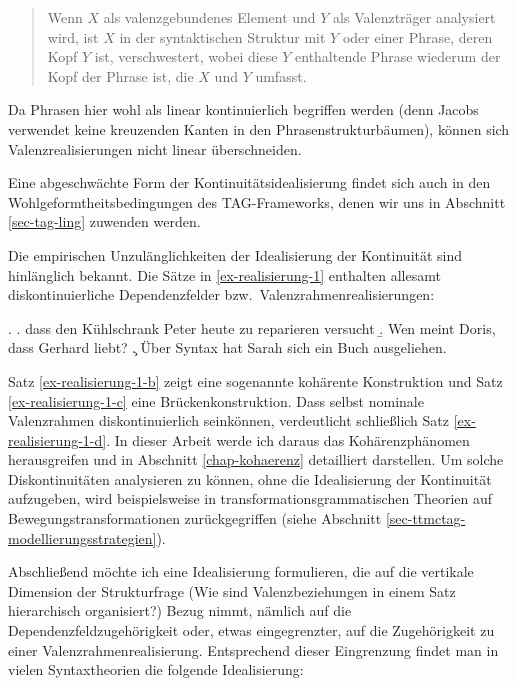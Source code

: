 \begin{quote}
Wenn $X$ als valenzgebundenes Element und $Y$ als Valenzträger analysiert wird, ist $X$ in der syntaktischen Struktur mit $Y$ oder einer Phrase, deren Kopf $Y$ ist, verschwestert, wobei diese $Y$ enthaltende Phrase wiederum der Kopf der Phrase ist, die $X$ und $Y$ umfasst. \citep[497]{Jacobs:09}
\end{quote}
Da Phrasen hier wohl als linear kontinuierlich begriffen werden (denn Jacobs verwendet keine kreuzenden Kanten in den Phrasenstrukturbäumen), können sich Valenzrealisierungen nicht linear überschneiden.  

Eine abgeschwächte Form der Kontinuitätsidealisierung findet sich auch in den Wohlgeformtheitsbedingungen des TAG-Frameworks, denen wir uns in Abschnitt \ref{sec-tag-ling} zuwenden werden. %

Die empirischen Unzulänglichkeiten der Idealisierung der Kontinuität sind hinlänglich bekannt. Die Sätze in \ref{ex-realisierung-1} enthalten allesamt diskontinuierliche Dependenzfelder bzw.\ Valenzrahmenrealisierungen:

\ex. \label{ex-realisierung-1}
\a. \label{ex-realisierung-1-b} dass den Kühlschrank Peter heute zu reparieren versucht
\b. \label{ex-realisierung-1-c} Wen meint Doris, dass Gerhard liebt? \hfill \citep[(2c)]{Featherston:05}
\c. \label{ex-realisierung-1-d} Über Syntax hat Sarah sich ein Buch ausgeliehen. \\ \citep[(1)]{DeKuthy:02}  

Satz \ref{ex-realisierung-1-b} zeigt eine sogenannte kohärente Konstruktion und Satz \ref{ex-realisierung-1-c} eine Brückenkonstruktion. Dass selbst nominale Valenzrahmen diskontinuierlich sein\linebreak können, verdeutlicht schließlich Satz \ref{ex-realisierung-1-d}. In dieser Arbeit werde ich daraus das Kohärenzphänomen herausgreifen und in Abschnitt \ref{chap-kohaerenz} detailliert darstellen. Um solche Diskontinuitäten analysieren zu können, ohne die Idealisierung der Kontinuität aufzugeben, wird beispielsweise in transformationsgrammatischen Theorien auf Bewegungstransformationen zurückgegriffen (siehe Abschnitt \ref{sec-ttmctag-modellierungsstrategien}). %


Abschlie\ss end möchte ich eine Idealisierung formulieren, die auf die vertikale Dimension der Strukturfrage (Wie sind Valenzbeziehungen in einem Satz hierarchisch organisiert?) Bezug nimmt, nämlich auf die Dependenzfeldzugehörigkeit oder, etwas eingegrenzter, auf die Zugehörigkeit zu einer Valenzrahmenrealisierung. Entsprechend dieser Eingrenzung findet man in vielen Syntaxtheorien die folgende Idealisierung: 

